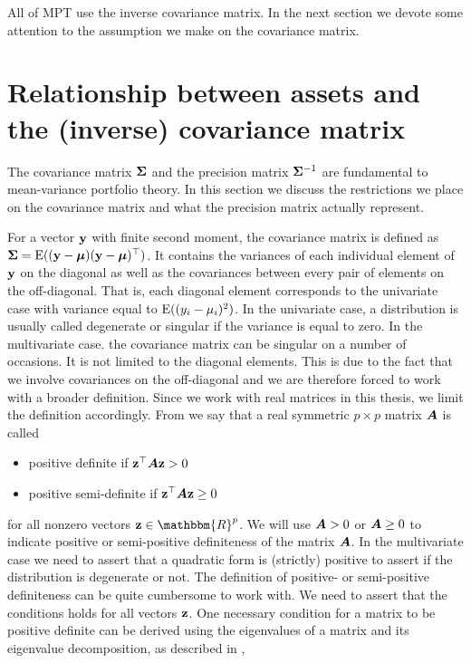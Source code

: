 \documentclass[oneside]{book}\usepackage{knitr}
\begin{document}
All of MPT use the inverse covariance matrix. In the next section we devote some attention to the assumption we make on the covariance matrix.  

\section{Relationship between assets and the (inverse) covariance matrix}\label{subsec:cov_prec_matrix}
The covariance matrix $\mathbf{\Sigma}$ and the precision matrix $\mathbf{\Sigma}^{-1}$ are fundamental to mean-variance portfolio theory. 
In this section we discuss the restrictions we place on the covariance matrix and what the precision matrix actually represent. 

For a vector $\mathbf{y}$ with finite second moment, the covariance matrix is defined as $\mathbf{\Sigma}=\operatorname{E}((\mathbf{y} - \mbox{\boldmath$\mu$})(\mathbf{y} - \mbox{\boldmath$\mu$})^\top)$. 
It contains the variances of each individual element of $\mathbf{y}$ on the diagonal as well as the covariances between every pair of elements on the off-diagonal. 
That is, each diagonal element corresponds to the univariate case with variance equal to $\operatorname{E}((y_i - \mu_i)^2)$. 
In the univariate case, a distribution is usually called degenerate or singular if the variance is equal to zero. 
In the multivariate case. the covariance matrix can be singular on a number of occasions. 
It is not limited to the diagonal elements.
This is due to the fact that we involve covariances on the off-diagonal and we are therefore forced to work with a broader definition.  
Since we work with real matrices in this thesis, we limit the definition accordingly. 
From \textcite[ch 14.2]{harville1997matrix} we say that a real symmetric $p\times p$ matrix $\mbox{\boldmath$A$}$ is called 
\begin{itemize}
	\item positive definite if $\mathbf{z}^\top \mbox{\boldmath$A$} \mathbf{z} > 0$
	\item positive semi-definite if $\mathbf{z}^\top \mbox{\boldmath$A$} \mathbf{z} \geq 0$
\end{itemize}
for all nonzero vectors $\bz \in \mathbbm{R}^p$.
We will use $\mbox{\boldmath$A$} > 0$ or $\mbox{\boldmath$A$} \geq 0$ to indicate positive or semi-positive definiteness of the matrix $\mbox{\boldmath$A$}$. 
In the multivariate case we need to assert that a quadratic form is (strictly) positive to assert if the distribution is degenerate or not. 
The definition of positive- or semi-positive definiteness can be quite cumbersome to work with. 
We need to assert that the conditions holds for all vectors $\mathbf{z}$. 
One necessary condition for a matrix to be positive definite can be derived using the eigenvalues of a matrix and its eigenvalue decomposition, as described in \textcite[ch. 21]{harville1997matrix},
\end{document}
